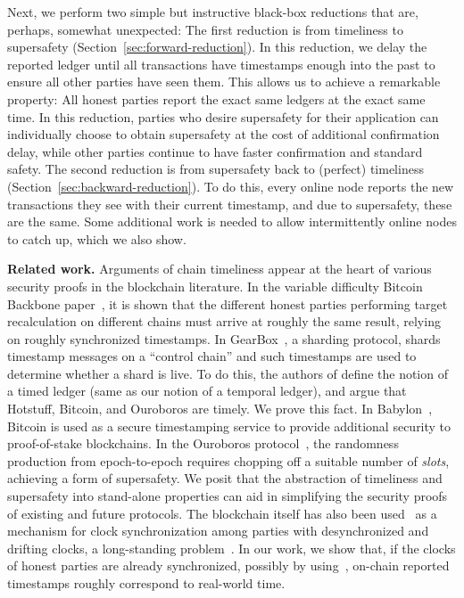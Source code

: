 Next, we perform two simple but instructive black-box reductions that are, perhaps, somewhat unexpected:
The first reduction is from timeliness to supersafety (Section~\ref{sec:forward-reduction}).
In this reduction, we delay the reported ledger until all
transactions have timestamps enough into the past to ensure all other parties have seen them.
This allows us to achieve a remarkable property: All honest parties report the
exact same ledgers at the exact same time.
In this reduction, parties who desire supersafety for their application can individually choose to obtain supersafety at the cost of additional confirmation delay, while other parties continue to have faster confirmation and standard safety. 
The second reduction is from supersafety back to (perfect) timeliness (Section~\ref{sec:backward-reduction}).
To do this, every online node reports the new transactions they see with
their current timestamp, and due to supersafety, these are the same.
Some additional work is needed to allow intermittently online nodes to catch up, which we also show.

\noindent
\textbf{Related work.}
Arguments of chain timeliness appear at the heart of various security proofs
in the blockchain literature.
In the variable difficulty Bitcoin Backbone paper~\cite{varbackbone},
it is shown that the different honest parties performing target recalculation on different chains
must arrive at roughly the same result, relying on roughly synchronized timestamps.
In GearBox~\cite{gearbox}, a sharding protocol, shards timestamp messages on a ``control chain'' and such timestamps are used to determine whether a shard is live.
To do this, the authors of \cite{gearbox} define the notion of a timed ledger (same as our notion of a temporal ledger), and argue that Hotstuff, Bitcoin, and Ouroboros are timely. We prove this fact.
In Babylon~\cite{babylon}, Bitcoin is used as a secure timestamping service to provide additional security to proof-of-stake blockchains.
In the Ouroboros protocol~\cite{ouroboros},
the randomness production from epoch-to-epoch requires chopping off a suitable number of \emph{slots},
achieving a form of supersafety.
We posit that the abstraction of timeliness and supersafety
into stand-alone properties can aid in simplifying the security proofs
of existing and future protocols.
The blockchain itself has also been used~\cite{klepsydra,chronos}
as a mechanism for clock synchronization among parties with desynchronized and drifting clocks,
a long-standing problem~\cite{lamport-synchronizing-clocks}.
In our work, we show that, if the clocks of honest parties are already synchronized, possibly by using~\cite{klepsydra,chronos},
on-chain reported timestamps roughly correspond to real-world time.

